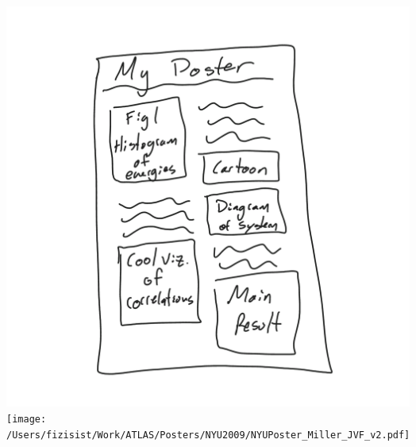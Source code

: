 \documentclass[hyperref={colorlinks=true}]{beamer}
\begin{document}
\begin{frame}
\begin{columns}
  \begin{figure}
    \includegraphics[width=0.9\columnwidth]{../Lecture7/PosterConcept.png}\\
    \texttt{[image: /Users/fizisist/Work/ATLAS/Posters/NYU2009/NYUPoster\_Miller\_JVF\_v2.pdf]}\\
  \end{figure}

  
  \end{columns}

  
\end{frame}

%

%
%
%  

\end{document}
